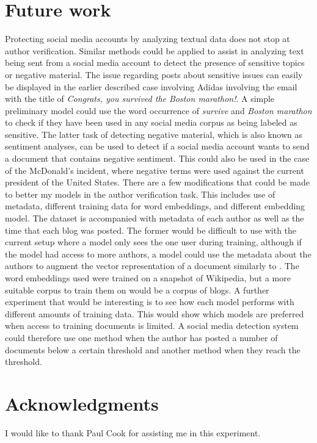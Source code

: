 \documentclass[11pt]{article}
\begin{document}
\section{Future work}
Protecting social media accounts by analyzing textual data does not stop at author verification. Similar methods could be applied to assist in analyzing text being sent from a social media account to detect the presence of sensitive topics or negative material. The issue regarding posts about sensitive issues can easily be displayed in the earlier described case involving Adidas involving the email with the title of \textit{Congrats, you survived the Boston marathon!}. A simple preliminary model could use the word occurrence of \textit{survive} and \textit{Boston marathon} to check if they have been used in any social media corpus as being labeled as sensitive. The latter task of detecting negative material, which is also known as sentiment analyses, can be used to detect if a social media account wants to send a document that contains negative sentiment. This could also be used in the case of the McDonald's incident, where negative terms were used against the current president of the United States.
There are a few modifications that could be made to better my models in the author verification task. This includes use of metadata, different training data for word embeddings, and different embedding model. The dataset is accompanied with metadata of each author as well as the time that each blog was posted. The former would be difficult to use with the current setup where a model only sees the one user during training, although if the model had access to more authors, a model could use the metadata about the authors to augment the vector representation of a document similarly to \cite{lynn}. The word embeddings used were trained on a snapshot of Wikipedia, but a more suitable corpus to train them on would be a corpus of blogs. A further experiment that would be interesting is to see how each model performs with different amounts of training data. This would show which models are preferred when access to training documents is limited. A social media detection system could therefore use one method when the author has posted a number of documents below a certain threshold and another method when they reach the threshold.


\section*{Acknowledgments}
I would like to thank Paul Cook for assisting me in this experiment.
\end{document}
